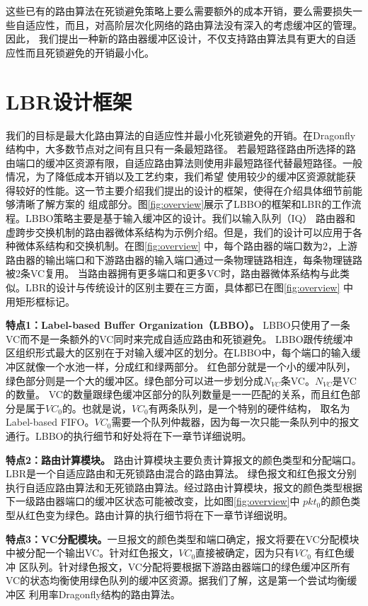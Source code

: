 这些已有的路由算法在死锁避免策略上要么需要额外的成本开销，要么需要损失一些自适应性，而且，对高阶层次化网络的路由算法没有深入的考虑缓冲区的管理。因此，
我们提出一种新的路由器缓冲区设计，不仅支持路由算法具有更大的自适应性而且死锁避免的开销最小化。

\section{LBR设计框架}

我们的目标是最大化路由算法的自适应性并最小化死锁避免的开销。在Dragonfly 结构中，大多数节点对之间有且只有一条最短路径。
若最短路径路由所选择的路由端口的缓冲区资源有限，自适应路由算法则使用非最短路径代替最短路径。一般情况，为了降低成本开销以及工艺约束，我们希望
使用较少的缓冲区资源就能获得较好的性能。这一节主要介绍我们提出的设计的框架，使得在介绍具体细节前能够清晰了解方案的
组成部分。图\ref{fig:overview}展示了LBBO的框架和LBR的工作流程。LBBO策略主要是基于输入缓冲区的设计。我们以输入队列（IQ）
路由器和虚跨步交换机制的路由器微体系结构为示例介绍。但是，我们的设计可以应用于各种微体系结构和交换机制。在图\ref{fig:overview}
中，每个路由器的端口数为2，上游路由器的输出端口和下游路由器的输入端口通过一条物理链路相连，每条物理链路被2条VC复用。
当路由器拥有更多端口和更多VC时，路由器微体系结构与此类似。LBR的设计与传统设计的区别主要在三方面，具体都已在图\ref{fig:overview}
中用矩形框标记。

\textbf{特点1：Label-based Buffer Organization（LBBO）。} LBBO只使用了一条VC而不是一条额外的VC同时来完成自适应路由和死锁避免。
LBBO跟传统缓冲区组织形式最大的区别在于对输入缓冲区的划分。在LBBO中，每个端口的输入缓冲区就像一个水池一样，分成红和绿两部分。
红色部分就是一个小的缓冲队列，绿色部分则是一个大的缓冲区。绿色部分可以进一步划分成$N_{VC}$条VC。$N_{VC}$是VC的数量。
VC的数量跟绿色缓冲区部分的队列数量是一一匹配的关系，而且红色部分是属于$VC_0$的。也就是说，$VC_0$有两条队列，是一个特别的硬件结构，
取名为Label-based FIFO。$VC_0$需要一个队列仲裁器，因为每一次只能一条队列中的报文通行。LBBO的执行细节和好处将在下一章节详细说明。


\textbf{特点2：路由计算模块。} 路由计算模块主要负责计算报文的颜色类型和分配端口。LBR是一个自适应路由和无死锁路由混合的路由算法。
绿色报文和红色报文分别执行自适应路由算法和无死锁路由算法。经过路由计算模块，报文的颜色类型根据下一级路由器端口的缓冲区状态可能被改变，比如图\ref{fig:overview}中
$pkt_0$的颜色类型从红色变为绿色。路由计算的执行细节将在下一章节详细说明。


\textbf{特点3：VC分配模块。}一旦报文的颜色类型和端口确定，报文将要在VC分配模块中被分配一个输出VC。针对红色报文，$VC_0$直接被确定，因为只有$VC_0$ 有红色缓冲
区队列。针对绿色报文，VC分配将要根据下游路由器端口的绿色缓冲区所有VC的状态均衡使用绿色队列的缓冲区资源。据我们了解，这是第一个尝试均衡缓冲区
利用率Dragonfly结构的路由算法。

